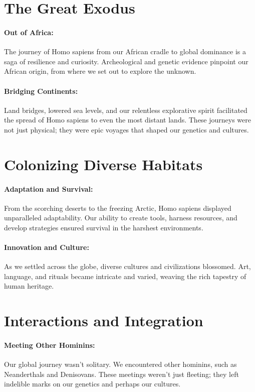 \documentclass[a4paper,12pt]{book}
\begin{document}
\section*{The Great Exodus}

\paragraph{Out of Africa:}
The journey of Homo sapiens from our African cradle to global dominance is a saga of resilience and curiosity. Archeological and genetic evidence pinpoint our African origin, from where we set out to explore the unknown.

\paragraph{Bridging Continents:}
Land bridges, lowered sea levels, and our relentless explorative spirit facilitated the spread of Homo sapiens to even the most distant lands. These journeys were not just physical; they were epic voyages that shaped our genetics and cultures.

\section*{Colonizing Diverse Habitats}

\paragraph{Adaptation and Survival:}
From the scorching deserts to the freezing Arctic, Homo sapiens displayed unparalleled adaptability. Our ability to create tools, harness resources, and develop strategies ensured survival in the harshest environments.

\paragraph{Innovation and Culture:}
As we settled across the globe, diverse cultures and civilizations blossomed. Art, language, and rituals became intricate and varied, weaving the rich tapestry of human heritage.

\section*{Interactions and Integration}

\paragraph{Meeting Other Hominins:}
Our global journey wasn’t solitary. We encountered other hominins, such as Neanderthals and Denisovans. These meetings weren’t just fleeting; they left indelible marks on our genetics and perhaps our cultures.
\end{document}

